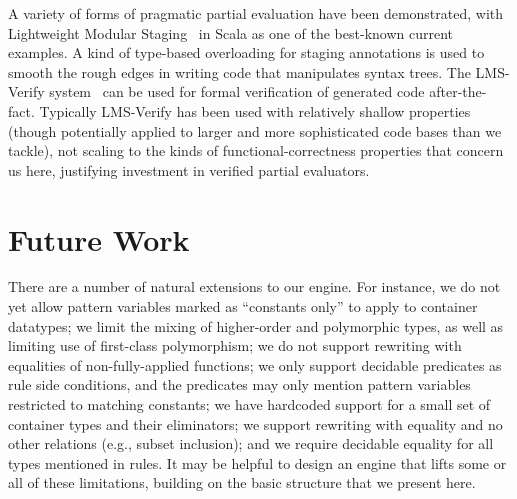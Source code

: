 
A variety of forms of pragmatic partial evaluation have been demonstrated, with Lightweight Modular Staging~\cite{LMS} in Scala as one of the best-known current examples.
A kind of type-based overloading for staging annotations is used to smooth the rough edges in writing code that manipulates syntax trees.
The LMS-Verify system~\cite{LMSVerify} can be used for formal verification of generated code after-the-fact.
Typically LMS-Verify has been used with relatively shallow properties (though potentially applied to larger and more sophisticated code bases than we tackle), not scaling to the kinds of functional-correctness properties that concern us here, justifying investment in verified partial evaluators.

\section{Future Work}

There are a number of natural extensions to our engine.
For instance, we do not yet allow pattern variables marked as ``constants only'' to apply to container datatypes; we limit the mixing of higher-order and polymorphic types, as well as limiting use of first-class polymorphism; we do not support rewriting with equalities of non-fully-applied functions; we only support decidable predicates as rule side conditions, and the predicates may only mention pattern variables restricted to matching constants; we have hardcoded support for a small set of container types and their eliminators; we support rewriting with equality and no other relations (e.g., subset inclusion); and we require decidable equality for all types mentioned in rules.
It may be helpful to design an engine that lifts some or all of these limitations, building on the basic structure that we present here.

%
